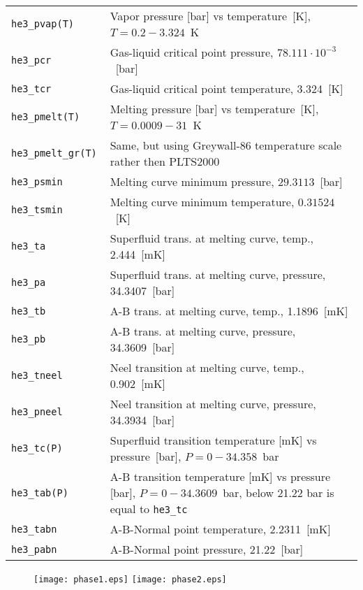 \documentclass[a4paper]{article}
\begin{document}
\medskip
\noindent\begin{tabular}{lp{12.5cm}}
\tt he3\_pvap(T)  & Vapor pressure [bar] vs temperature~[K],\newline
                    $ T = 0.2 - 3.324$~K \\
\tt he3\_pcr      & Gas-liquid critical point pressure, $78.111\cdot 10^{-3}$~[bar] \\
\tt he3\_tcr      & Gas-liquid critical point temperature, 3.324~[K] \\
\tt he3\_pmelt(T) & Melting pressure [bar] vs temperature~[K],\newline
                    $ T = 0.0009 - 31$~K\\
\tt he3\_pmelt\_gr(T) & Same, but using Greywall-86 temperature scale rather then PLTS2000\\
\tt he3\_psmin    & Melting curve minimum pressure, $29.3113$~[bar]\\
\tt he3\_tsmin    & Melting curve minimum temperature, $0.31524$~[K]\\
\tt he3\_ta       & Superfluid trans. at melting curve, temp., 2.444~[mK]\\
\tt he3\_pa       & Superfluid trans. at melting curve, pressure, 34.3407~[bar]\\
\tt he3\_tb       & A-B trans. at melting curve, temp., 1.1896~[mK]\\
\tt he3\_pb       & A-B trans. at melting curve, pressure, 34.3609~[bar]\\
\tt he3\_tneel    & Neel transition at melting curve, temp., 0.902~[mK]\\
\tt he3\_pneel    & Neel transition at melting curve, pressure, 34.3934~[bar]\\
\tt he3\_tc(P)    & Superfluid transition temperature [mK] vs pressure~[bar],\newline
                    $ P = 0 - 34.358 $~bar\\
\tt he3\_tab(P)   & A-B transition temperature [mK] vs pressure [bar],\newline
                    $ P = 0 - 34.3609 $~bar, below 21.22 bar is equal to {\tt he3\_tc}\\
\tt he3\_tabn     & A-B-Normal point temperature, 2.2311~[mK]\\
\tt he3\_pabn     & A-B-Normal point pressure, 21.22~[bar]\\
\end{tabular}


\begin{figure}[p]
\texttt{[image: phase1.eps]}
\texttt{[image: phase2.eps]}
\end{figure}
\end{document}
